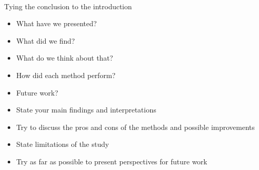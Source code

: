 \documentclass[amssymb,twocolumn,aps]{revtex4}
\begin{document}
\\
Tying the conclusion to the introduction
\begin{itemize}
    \item What have we presented?
    \item What did we find?
    \item What do we think about that?
    \item How did each method perform?
    \item Future work?
\end{itemize}

\begin{itemize}
    \item State your main findings and interpretations
    \item Try to discuss the pros and cons of the methods and possible improvements
    \item State limitations of the study
    \item Try as far as possible to present perspectives for future work
\end{itemize}


\end{document}
